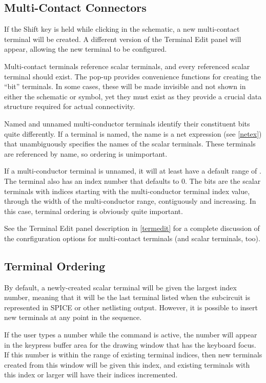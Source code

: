 \subsection{Multi-Contact Connectors}

If the {\kb Shift} key is held while clicking in the schematic,
a new multi-contact terminal will be created.  A different version
of the {\cb Terminal Edit} panel will appear, allowing the new terminal
to be configured.

Multi-contact terminals reference scalar terminals, and every
referenced scalar terminal should exist.  The pop-up provides
convenience functions for creating the ``bit'' terminals.  In some
cases, these will be made invisible and not shown in either the
schematic or symbol, yet they must exist as they provide a crucial
data structure required for actual connectivity.

Named and unnamed multi-conductor terminals identify their constituent
bits quite differently.  If a terminal is named, the name is a net
expression (see \ref{netex}) that unambiguously specifies the names of
the scalar terminals.  These terminals are referenced by name, so
ordering is unimportant.

If a multi-conductor terminal is unnamed, it will at least have a
default range of {\vt [0:0]}.  The terminal also has an index number
that defaults to 0.  The bits are the scalar terminals with indices
starting with the multi-conductor terminal index value, through the
width of the multi-conductor range, contiguously and increasing.  In
this case, terminal ordering is obviously quite important.

See the {\cb Terminal Edit} panel description in \ref{termedit} for a
complete discussion of the conrfiguration options for multi-contact
terminals (and scalar terminals, too).

\subsection{Terminal Ordering}

By default, a newly-created scalar terminal will be given the largest
index number, meaning that it will be the last terminal listed when
the subcircuit is represented in SPICE or other netlisting output. 
However, it is possible to insert new terminals at any point in the
sequence.
 
If the user types a number while the command is active, the number
will appear in the keypress buffer area for the drawing window that
has the keyboard focus.  If this number is within the range of
existing terminal indices, then new terminals created from this window
will be given this index, and existing terminals with this index or
larger will have their indices incremented.
 
